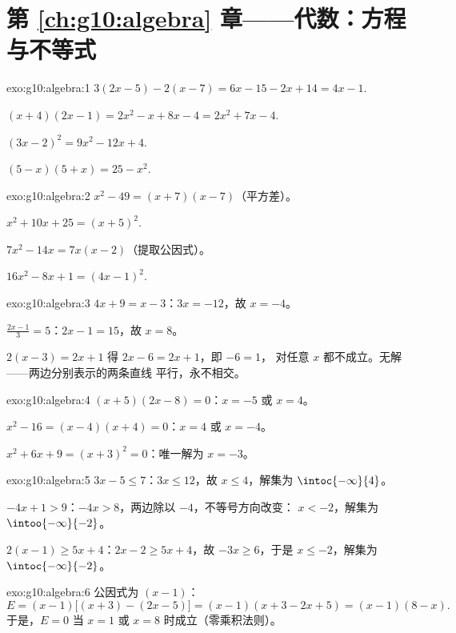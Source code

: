 \section*{第 \ref{ch:g10:algebra} 章——代数：方程与不等式}

\begin{solution}{exo:g10:algebra:1}
$3(2x-5) - 2(x-7) = 6x - 15 - 2x + 14 = 4x - 1$.

$(x+4)(2x-1) = 2x^2 - x + 8x - 4 = 2x^2 + 7x - 4$.

$(3x-2)^2 = 9x^2 - 12x + 4$.

$(5-x)(5+x) = 25 - x^2$.
\end{solution}

\begin{solution}{exo:g10:algebra:2}
$x^2 - 49 = (x+7)(x-7)$（平方差）。

$x^2 + 10x + 25 = (x+5)^2$.

$7x^2 - 14x = 7x(x - 2)$（提取公因式）。

$16x^2 - 8x + 1 = (4x - 1)^2$.
\end{solution}

\begin{solution}{exo:g10:algebra:3}
$4x + 9 = x - 3$：$3x = -12$，故 $x = -4$。

$\frac{2x-1}{3} = 5$：$2x - 1 = 15$，故 $x = 8$。

$2(x-3) = 2x + 1$ 得 $2x - 6 = 2x + 1$，即 $-6 = 1$，
对任意 $x$ 都不成立。无解——两边分别表示的两条直线
平行，永不相交。
\end{solution}

\begin{solution}{exo:g10:algebra:4}
$(x+5)(2x-8) = 0$：$x = -5$ 或 $x = 4$。

$x^2 - 16 = (x-4)(x+4) = 0$：$x = 4$ 或 $x = -4$。

$x^2 + 6x + 9 = (x+3)^2 = 0$：唯一解为 $x = -3$。
\end{solution}

\begin{solution}{exo:g10:algebra:5}
$3x - 5 \leq 7$：$3x \leq 12$，故 $x \leq 4$，解集为
$\intoc{-\infty}{4}$。

$-4x + 1 > 9$：$-4x > 8$，两边除以 $-4$，不等号方向改变：
$x < -2$，解集为 $\intoo{-\infty}{-2}$。

$2(x-1) \geq 5x + 4$：$2x - 2 \geq 5x + 4$，故 $-3x \geq 6$，于是
$x \leq -2$，解集为 $\intoc{-\infty}{-2}$。
\end{solution}

\begin{solution}{exo:g10:algebra:6}
公因式为 $(x-1)$：
\[
E = (x-1)\bigl[(x+3) - (2x - 5)\bigr] = (x-1)(x + 3 - 2x + 5)
= (x-1)(8 - x).
\]
于是，$E = 0$ 当 $x = 1$ 或 $x = 8$ 时成立（零乘积法则）。
\end{solution}

